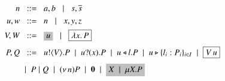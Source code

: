 	\begin{figure}[t]
		\begin{align*}
			n  & \bnfis a,b \bnfbar s, \dual{s} 
			\\
			u,w  & \bnfis n \bnfbar x,y,z 
			\\
			V,W  & \bnfis \nonhosyntax{u} \bnfbar \nonpisyntax{\abs{x}{P}}
			\\[1mm]
			P,Q
			 & \bnfis 
			\bout{u}{V}{P}  \sbnfbar  \binp{u}{x}{P} \sbnfbar
			\bsel{u}{l} P \sbnfbar \bbra{u}{l_i:P_i}_{i \in I} \sbnfbar \nonpisyntax{\appl{V}{u}}
			\\[1mm]
			 & \sbnfbar P\Par Q \sbnfbar \news{n} P 
			\sbnfbar \inact \sbnfbar \nonhosyntax{\rvar{X} \sbnfbar \recp{X}{P}}
		\end{align*}
	\caption{}
	\label{fig:syntax}
\end{figure}

